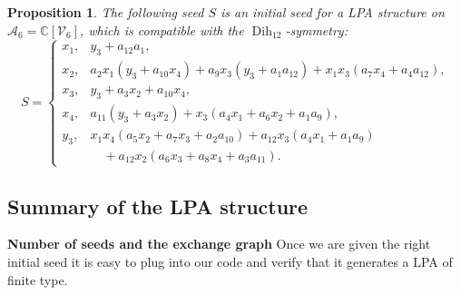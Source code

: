 \documentclass[pdftex]{sigma}
\numberwithin{equation}{section}
\newtheorem{prop}[thm]{Proposition}
\theoremstyle{definition}
\newcommand{\CC}{\mathbb{C}}
\DeclareMathOperator{\Dih}{Dih}
\begin{document}
\begin{prop}\label{prop!initial-seed}
The following seed $S$ is an initial seed for a LPA structure on $\mathcal A_6=\CC[\mathcal V_6]$, which is compatible with the $\Dih_{12}$-symmetry:
\[ S = \begin{cases}
x_1, & y_3 + a_{12}a_1, \\
x_2, & a_2x_1(y_3 + a_{10}x_4) + a_9x_3(y_3 + a_1a_{12}) + x_1x_3(a_7x_4 + a_4a_{12}), \\
x_3, & y_3 + a_3x_2 + a_{10}x_4, \\
x_4, & a_{11}(y_3 + a_3x_2) + x_3(a_4x_1 + a_6x_2 + a_1a_9), \\
y_3, & x_1x_4(a_5 x_2 + a_7x_3 + a_2a_{10}) + a_{12}x_3(a_4x_1 + a_1a_9)\\
&\quad + a_{12}x_2(a_6x_3 + a_8x_4 + a_3a_{11}).
\end{cases}\]
\end{prop}


\subsection{Summary of the LPA structure}

{\bf Number of seeds and the exchange graph}
Once we are given the right initial seed it is easy to plug into our code and verify that it generates a LPA of finite type.
\end{document}
